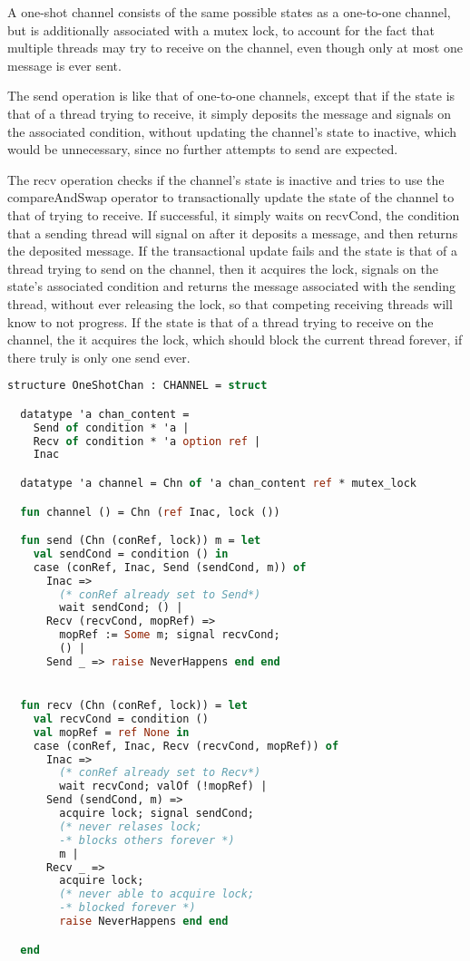 \documentclass{article}
\begin{document}
A one-shot channel consists of the same possible states as a one-to-one channel, but is
additionally associated with a mutex lock, to account for the fact that multiple threads may
try to receive on the channel, even though only at most one message is ever sent.

The send operation is like that of one-to-one channels, except that if the state is that of a
thread trying to receive, it simply deposits the message and signals on the associated
condition, without updating the channel's state to inactive, which would be unnecessary, since
no further attempts to send are expected.

The recv operation checks if the channel's state is inactive and tries to use the
compareAndSwap operator to transactionally update the state of the channel to that of trying
to receive.  If successful, it simply waits on recvCond, the condition that a sending thread
will signal on after it deposits a message, and then returns the deposited message.  If the
transactional update fails and the state is that of a thread trying to send on the channel,
then it acquires the lock, signals on the state's associated condition and returns the message
associated with the sending thread, without ever releasing the lock, so that competing
receiving threads will know to not progress.  If the state is that of a thread trying to
receive on the channel, the it acquires the lock, which should block the current thread
forever, if there truly is only one send ever.


\begin{lstlisting}[language=ML, style=codestyle1, escapechar=\%]
  structure OneShotChan : CHANNEL = struct

  datatype 'a chan_content =
    Send of condition * 'a |
    Recv of condition * 'a option ref |
    Inac  

  datatype 'a channel = Chn of 'a chan_content ref * mutex_lock

  fun channel () = Chn (ref Inac, lock ())

  fun send (Chn (conRef, lock)) m = let
    val sendCond = condition () in
    case (conRef, Inac, Send (sendCond, m)) of
      Inac =>
        (* conRef already set to Send*)
        wait sendCond; () |
      Recv (recvCond, mopRef) =>
        mopRef := Some m; signal recvCond;
        () |
      Send _ => raise NeverHappens end end


  fun recv (Chn (conRef, lock)) = let
    val recvCond = condition ()
    val mopRef = ref None in
    case (conRef, Inac, Recv (recvCond, mopRef)) of
      Inac =>
        (* conRef already set to Recv*)
        wait recvCond; valOf (!mopRef) |
      Send (sendCond, m) =>
        acquire lock; signal sendCond;
        (* never relases lock;
        -* blocks others forever *)
        m |
      Recv _ =>
        acquire lock;
        (* never able to acquire lock;
        -* blocked forever *)
        raise NeverHappens end end

  end
  \end{lstlisting}
\end{document}

